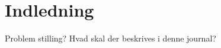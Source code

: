 \tableofcontents
\listoftodos



\newpage
\section{Indledning}
Problem stilling? Hvad skal der beskrives i denne journal? 
